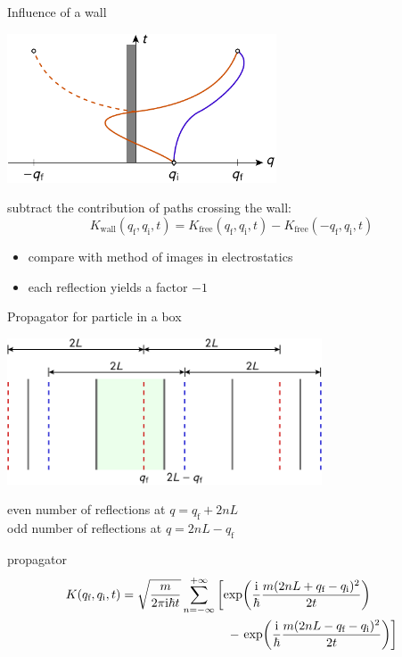 \documentclass[t,dvipsnames]{beamer}
\begin{document}
\begin{frame}[t]{Influence of a wall}
 \begin{center}
  \includegraphics[width=0.6\textwidth]{wall}
 \end{center}

 subtract the contribution of paths crossing the wall:
 \begin{displaymath}
  K_\text{wall}(q_\text{f}, q_\text{i}, t)
  = K_\text{free}(q_\text{f}, q_\text{i}, t) - K_\text{free}(-q_\text{f}, q_\text{i}, t)
 \end{displaymath}

 \begin{itemize}
  \item compare with method of images in electrostatics
  \item each reflection yields a factor $-1$
 \end{itemize}
\end{frame}

\begin{frame}[t]{Propagator for particle in a box}

 \vspace{-0.3truecm}
 \begin{center}
  \includegraphics[width=0.7\textwidth]{images}
 \end{center}

 \textcolor{red!60!black}{even number of reflections at $q = q_\text{f}+2nL$}\\
 \textcolor{blue!60!black}{odd number of reflections at $q = 2nL-q_\text{f}$}

 \vspace{0.3truecm}
 propagator
 \begin{displaymath}
  \begin{aligned}
   K(q_\text{f}, q_\text{i}, t) &= \sqrt{\frac{m}{2\pi\text{i}\hbar t}}\sum_{n=-\infty}^{+\infty}
    \left[\exp\!\left(\frac{\text{i}}{\hbar}
	  \frac{m(2nL+q_\text{f}-q_\text{i})^2}{2t}\right)\right.\\
    &\hspace{3truecm}-\left.\exp\!\left(\frac{\text{i}}{\hbar}
	  \frac{m(2nL-q_\text{f}-q_\text{i})^2}{2t}\right)\right]
  \end{aligned}
 \end{displaymath}
\end{frame}
\end{document}

